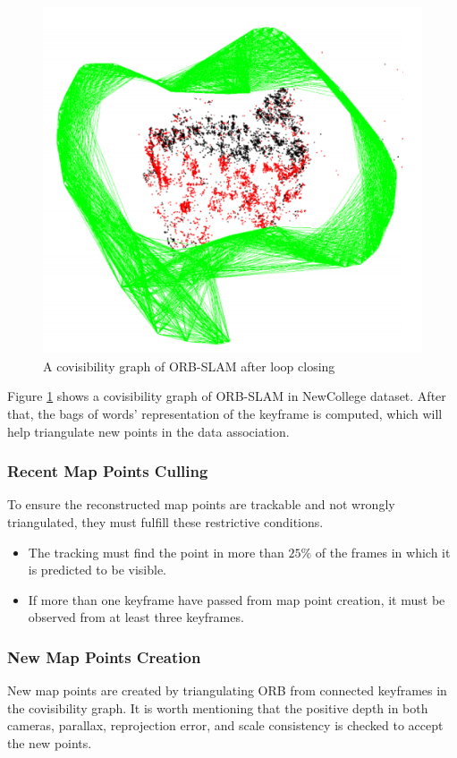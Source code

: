 \documentclass[letterpaper, 10 pt, conference]{ieeeconf}  %
\begin{document}
%
\begin{figure}[!htbp]%
\centering
\includegraphics[scale=0.25]{./images/covisibility_graph}
\caption{A covisibility graph of ORB-SLAM after loop closing}
\label{covisibility_graph}
\end{figure}
%
Figure \ref{covisibility_graph} shows a covisibility graph of ORB-SLAM in NewCollege dataset. After that, the bags of words' representation of the keyframe is computed, which will help triangulate new points in the data association.

\subsubsection{Recent Map Points Culling}
\label{Mappoint_culling}
To ensure the reconstructed map points are trackable and not wrongly triangulated, they must fulfill these restrictive conditions.
%
\begin{itemize}
\item The tracking must find the point in more than $25\%$ of the frames in which it is predicted to be visible.
\item If more than one keyframe  have passed from map point creation, it must be observed from at least three keyframes.
\end{itemize}
%
\subsubsection{New Map Points Creation}
New map points are created by triangulating ORB from connected keyframes in the covisibility graph. It is worth mentioning that the positive depth in both cameras, parallax, reprojection error, and scale consistency is checked to accept the new points.
\end{document}
